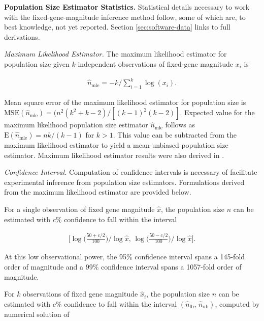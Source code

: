 \textbf{Population Size Estimator Statistics.}
Statistical details necessary to work with the fixed-gene-magnitude inference method follow, some of which are, to best knowledge, not yet reported.
Section \ref{sec:software-data} links to full derivations.

\textit{Maximum Likelihood Estimator.}
The maximum likelihood estimator for population size given $k$ independent observations of fixed-gene magnitude $x_i$ is
\begin{footnotesize}
\begin{align} \label{eqn:popsize_mle}
\hat{n}_\mathrm{mle} = -k/\textstyle\sum_{i=1}^k \log( x_i ).
\end{align}
\end{footnotesize}

Mean square error of the maximum likelihood estimator for population size is $\mathrm{MSE}(\hat{n}_\mathrm{mle}) = (n^2 (k^{2}+ k-2) / [(k-1)^{2}(k-2)]$.
Expected value for the maximum likelihood population size estimator $\hat{n}_\mathrm{mle}$ follows as $\mathrm{E}(\hat{n}_\mathrm{mle}) = nk/(k-1)$ for $k>1$.
This value can be subtracted from the maximum likelihood estimator to yield a mean-unbiased population size estimator.
Maximum likelihood estimator results were also derived in \citep{varagnolo2010distributed}.

\textit{Confidence Interval.}
Computation of confidence intervals is necessary of facilitate experimental inference from population size estimators.
Formulations derived from the maximum likelihood estimator are provided below.

For a single observation of fixed gene magnitude $\hat{x}$, the population size $n$ can be estimated with $c\%$ confidence to fall within the interval

\begin{footnotesize}
\begin{align*}
\Big[
\log\Big(\frac{50+c/2}{100}\Big) / \log\hat{x}, \,
\log\Big(\frac{50-c/2}{100}\Big) / \log\hat{x}
\Big].
\end{align*}
\end{footnotesize}

At this low observational power, the 95\% confidence interval spans a 145-fold order of magnitude and a 99\% confidence interval spans a 1057-fold order of magnitude.

For $k$ observations of fixed gene magnitude $\hat{x}_i$, the population size $n$ can be estimated with $c\%$ confidence to fall within the interval $(\hat{n}_\mathrm{lb}, \, \hat{n}_\mathrm{ub})$, computed by numerical solution of

